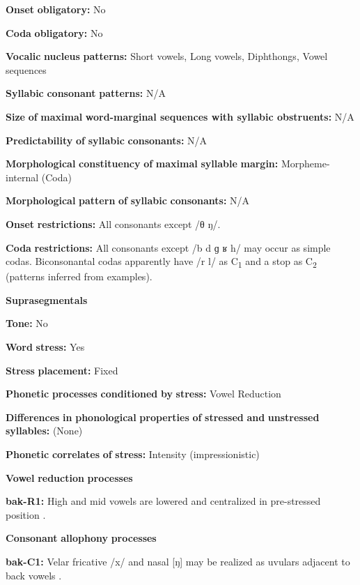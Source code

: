 \textbf{Onset} \textbf{obligatory:} No

\textbf{Coda} \textbf{obligatory:} No

\textbf{Vocalic} \textbf{nucleus} \textbf{patterns:} Short vowels, Long vowels, Diphthongs, Vowel sequences

\textbf{Syllabic} \textbf{consonant} \textbf{patterns:} N/A

\textbf{Size} \textbf{of} \textbf{maximal} \textbf{word{}-marginal sequences with syllabic obstruents:} N/A

\textbf{Predictability} \textbf{of} \textbf{syllabic} \textbf{consonants:} N/A

\textbf{Morphological} \textbf{constituency} \textbf{of} \textbf{maximal} \textbf{syllable} \textbf{margin:} Morpheme-internal (Coda)

\textbf{Morphological} \textbf{pattern} \textbf{of} \textbf{syllabic} \textbf{consonants:} N/A

\textbf{Onset} \textbf{restrictions:} All consonants except /θ ŋ/.

\textbf{Coda} \textbf{restrictions:} All consonants except /b d ɡ ʁ h/ may occur as simple codas. Biconsonantal codas apparently have /r l/ as C\textsubscript{1} and a stop as C\textsubscript{2} (patterns inferred from examples).

\textbf{Suprasegmentals}

\textbf{Tone:} No

\textbf{Word} \textbf{stress:} Yes

\textbf{Stress} \textbf{placement:} Fixed

\textbf{Phonetic} \textbf{processes} \textbf{conditioned} \textbf{by} \textbf{stress:} Vowel Reduction

\textbf{Differences} \textbf{in} \textbf{phonological} \textbf{properties} \textbf{of} \textbf{stressed} \textbf{and} \textbf{unstressed} \textbf{syllables:} (None)

\textbf{Phonetic} \textbf{correlates} \textbf{of} \textbf{stress:} Intensity (impressionistic)

\textbf{Vowel} \textbf{reduction} \textbf{processes}

\textbf{bak-R1:} High and mid vowels are lowered and centralized in pre-stressed position \citep{BerksonEtAl2016}.

\textbf{Consonant} \textbf{allophony} \textbf{processes}

\textbf{bak-C1:} Velar fricative /x/ and nasal [ŋ] may be realized as uvulars adjacent to back vowels \citep[11]{Poppe1964}.

